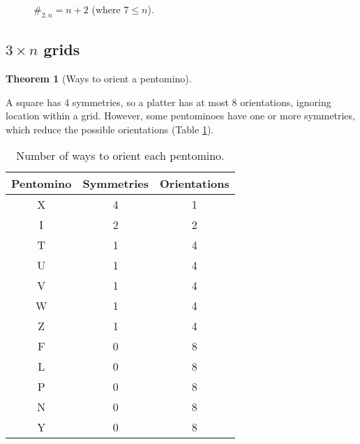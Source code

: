 \documentclass{article}
\theoremstyle{definition}%
\newtheorem{theorem}{Theorem}[section]
\begin{document}
\begin{figure}[htbp]
    \centering
    \caption{$\#_{2, n} = n + 2$ (where $7 \le n$). \cite{sheet}}
\end{figure}

\subsection{\texorpdfstring{$3 \times n$}{3 \texttimes n} grids}

\begin{theorem}[Ways to orient a pentomino]
\label{th:Pentomino orientations}

A square has 4 symmetries, so a platter has at most 8 orientations, ignoring location within a grid. However, some pentominoes have one or more symmetries, which reduce the possible orientations (Table \ref{tab:pentomino orientations}).

    \begin{table}[htbp]
        \centering
        \caption{Number of ways to orient each pentomino. \cite[0:41]{v1}}
        \begin{tabular}{ccc}
            \toprule
            Pentomino & Symmetries & Orientations \\
            \midrule
            X & 4 & 1 \\
            I & 2 & 2 \\
            T & 1 & 4 \\
            U & 1 & 4 \\
            V & 1 & 4 \\
            W & 1 & 4 \\
            Z & 1 & 4 \\
            F & 0 & 8 \\
            L & 0 & 8 \\
            P & 0 & 8 \\
            N & 0 & 8 \\
            Y & 0 & 8 \\
            \bottomrule
        \end{tabular}
        \label{tab:pentomino orientations}
    \end{table}
\end{theorem}
\end{document}
